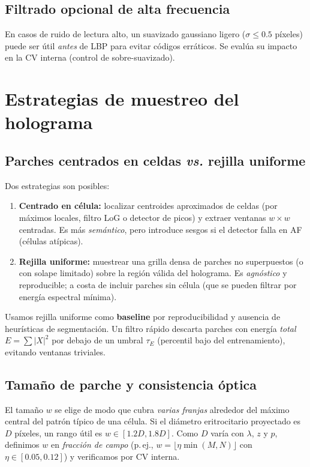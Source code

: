 \subsection{Filtrado opcional de alta frecuencia}
En casos de ruido de lectura alto, un suavizado gaussiano ligero ($\sigma\le 0.5$ píxeles) puede ser útil \emph{antes} de LBP para evitar códigos erráticos. Se evalúa su impacto en la CV interna (control de sobre-suavizado).

\section{Estrategias de muestreo del holograma}
\label{sec:muestras}

\subsection{Parches centrados en celdas \emph{vs.} rejilla uniforme}
Dos estrategias son posibles:
\begin{enumerate}
\item \textbf{Centrado en célula:} localizar centroides aproximados de celdas (por máximos locales, filtro LoG o detector de picos) y extraer ventanas $w\times w$ centradas. Es más \emph{semántico}, pero introduce sesgos si el detector falla en AF (células atípicas).
\item \textbf{Rejilla uniforme:} muestrear una grilla densa de parches no superpuestos (o con solape limitado) sobre la región válida del holograma. Es \emph{agnóstico} y reproducible; a costa de incluir parches sin célula (que se pueden filtrar por energía espectral mínima).
\end{enumerate}
Usamos rejilla uniforme como \textbf{baseline} por reproducibilidad y ausencia de heurísticas de segmentación. Un filtro rápido descarta parches con energía \emph{total} $E=\sum |X|^2$ por debajo de un umbral $\tau_E$ (percentil bajo del entrenamiento), evitando ventanas triviales.

\subsection{Tamaño de parche y consistencia óptica}
El tamaño $w$ se elige de modo que cubra \emph{varias franjas} alrededor del máximo central del patrón típico de una célula. Si el diámetro eritrocitario proyectado es $D$ píxeles, un rango útil es $w\in[1.2D,1.8D]$. Como $D$ varía con $\lambda$, $z$ y $p$, definimos $w$ en \emph{fracción de campo} (p.\,ej., $w=\lfloor \eta\min(M,N)\rfloor$ con $\eta\in[0.05,0.12]$) y verificamos por CV interna.

